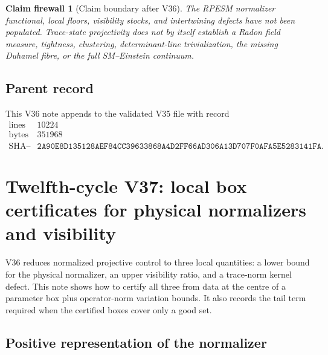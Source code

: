 \documentclass[11pt]{article}
\newtheorem{firewall}[theorem]{Claim firewall}
\theoremstyle{remark}
\begin{document}
\begin{firewall}[Claim boundary after V36]
\label{fire:v12v36-claim}
The RPESM normalizer functional, local floors, visibility stocks, and
intertwining defects have not been populated.  Trace-state
projectivity does not by itself establish a Radon field measure,
tightness, clustering, determinant-line trivialization, the missing
Duhamel fibre, or the full SM--Einstein continuum.
\end{firewall}

\subsection{Parent record}

This V36 note appends to the validated V35 file with record
\[
\begin{array}{c|c}
\text{lines}&10224\\
\text{bytes}&351968\\
\text{SHA--256}&
\texttt{2A90E8D135128AEF84CC39633868A4D2FF66AD306A13D707F0AFA5E5283141FA}.
\end{array}
\]


\section{Twelfth-cycle V37: local box certificates for physical
normalizers and visibility}
\label{sec:v12v37}

V36 reduces normalized projective control to three local quantities:
a lower bound for the physical normalizer, an upper visibility ratio,
and a trace-norm kernel defect.  This note shows how to certify all
three from data at the centre of a parameter box plus operator-norm
variation bounds.  It also records the tail term required when the
certified boxes cover only a good set.

\subsection{Positive representation of the normalizer}
\end{document}
